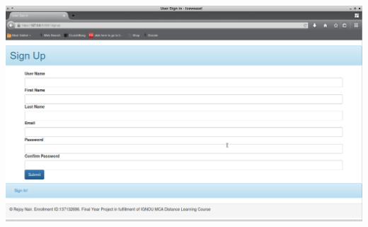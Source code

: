 \documentclass[hidelinks,a4paper,12pt]{article}
\begin{document}
\begin{sideways}
    \centering
		\begin{minipage}{\textheight}
		\centering
		\includegraphics[width=0.86\textheight , keepaspectratio ]{./Images/SignupScreen.png}\\[-1em]
		\label{fig:2}
		\end{minipage}
\end{sideways}
\end{document}
